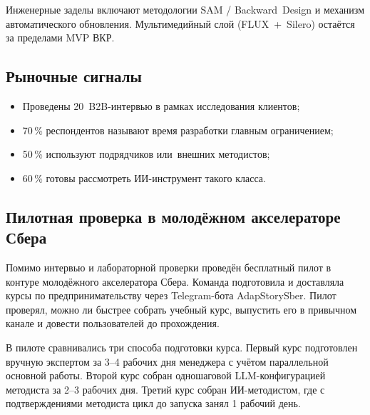 Инженерные заделы включают методологии SAM / Backward~Design и механизм
автоматического обновления. Мультимедийный слой (FLUX~+~Silero) остаётся
за пределами MVP ВКР.

\subsection{Рыночные сигналы}

\begin{itemize}
  \item Проведены 20~B2B-интервью в рамках исследования клиентов;
  \item 70\,\% респондентов называют время разработки главным ограничением;
  \item 50\,\% используют подрядчиков или~внешних методистов;
  \item 60\,\% готовы рассмотреть ИИ-инструмент такого класса.
\end{itemize}

\subsection{Пилотная проверка в молодёжном акселераторе Сбера}

Помимо интервью и лабораторной проверки проведён бесплатный пилот
в контуре молодёжного акселератора Сбера. Команда подготовила и доставляла
курсы по предпринимательству через Telegram-бота AdapStorySber. Пилот
проверял, можно ли быстрее собрать учебный курс, выпустить его в привычном
канале и довести пользователей до прохождения.

В пилоте сравнивались три способа подготовки курса. Первый курс
подготовлен вручную экспертом за 3–4 рабочих дня менеджера с учётом
параллельной основной работы. Второй курс собран одношаговой
LLM-конфигурацией методиста за 2–3 рабочих дня. Третий курс собран
ИИ-методистом, где с подтверждениями методиста цикл до запуска занял
1 рабочий день.

